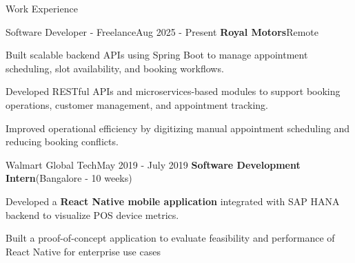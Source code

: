 \begin{cvsection}{Work Experience}
\begin{rSubsection}{\fontsize{12pt}{14pt} \selectfont Software Developer - Freelance}{Aug 2025 - Present}{\bf \fontsize{11pt}{14pt} \selectfont Royal Motors}{Remote}

\item Built scalable backend APIs using Spring Boot to manage appointment scheduling, slot availability, and booking workflows.

\item Developed RESTful APIs and microservices-based modules to support booking operations, customer management, and appointment tracking.

\item Improved operational efficiency by digitizing manual appointment scheduling and reducing booking conflicts.


\end{rSubsection}


\begin{rSubsection}{\fontsize{12pt}{14pt} \selectfont Walmart Global Tech}{May 2019 - July 2019}{\bf \fontsize{11pt}{14pt} \selectfont Software Development Intern}{(Bangalore - 10 weeks)}

\item Developed a {\bf React Native mobile application} integrated with SAP HANA backend to visualize POS device metrics.

\item Built a proof-of-concept application to evaluate feasibility and performance of React Native for enterprise use cases
\end{rSubsection}

\end{cvsection}